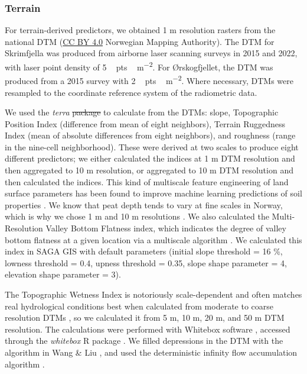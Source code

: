 \documentclass[soil, manuscript]{copernicus}
\providecommand{\DIFadd}[1]{{\protect\color{blue}\uwave{#1}}} %
\providecommand{\DIFdel}[1]{{\protect\color{red}\sout{#1}}}                      %
\providecommand{\DIFaddbegin}{} %
\providecommand{\DIFaddend}{} %
\providecommand{\DIFdelbegin}{} %
\providecommand{\DIFdelend}{} %
\begin{document}
\DIFaddend \subsubsection{Terrain}

For terrain-derived predictors, we obtained 1 m resolution rasters from the national DTM (\href{https://creativecommons.org/licenses/by/4.0/}{CC BY 4.0} Norwegian Mapping Authority).
The DTM for Skrimfjella was produced from airborne laser scanning surveys in 2015 and 2022, with laser point density of \unit{5\,pts\,m^{-2}}.
For Ørskogfjellet, the DTM was produced from a 2015 survey with \unit{2\,pts\,m^{-2}}.
Where necessary, DTMs were resampled to the coordinate reference system of the radiometric data.

We used the \emph{terra} \DIFdelbegin \DIFdel{package }\DIFdelend \DIFaddbegin \DIFadd{R package (v1.8) }\DIFaddend to calculate from the DTMs: slope, Topographic Position Index (difference from mean of eight neighbors), Terrain Ruggedness Index (mean of absolute differences from eight neighbors), and roughness (range in the nine-cell neighborhood).
These were derived at two scales to produce eight different predictors; we either calculated the indices at 1 m DTM resolution and then aggregated to 10 m resolution, or aggregated to 10 m DTM resolution and then calculated the indices.
This kind of multiscale feature engineering of land surface parameters has been found to improve machine learning predictions of soil properties \citep{millerImpactMultiscalePredictor2015, dornikOptimalScalingPredictors2022, newmanAssessingSpatiallyHeterogeneous2023}.
We know that peat depth tends to vary at fine scales in Norway, which is why we chose 1 m and 10 m resolutions \citep{maxwellLandsurfaceParametersSpatial2022}.
We also calculated the Multi-Resolution Valley Bottom Flatness index, which indicates the degree of valley bottom flatness at a given location via a multiscale algorithm \citep{gallantMultiresolutionIndexValley2003}.
We calculated this index in SAGA GIS \citep[v.9.3.2, Morphometry library,][]{conradSystemAutomatedGeoscientific2015} with default parameters (initial slope threshold = 16 \%, lowness threshold = 0.4, upness threshold = 0.35, slope shape parameter = 4, elevation shape parameter = 3).

The Topographic Wetness Index \citep{quinnPredictionHillslopeFlow1991} is notoriously scale-dependent and often matches real hydrological conditions best when calculated from moderate to coarse resolution DTMs \citep{agrenEvaluatingDigitalTerrain2014, riihimakiTopographicWetnessIndex2021}, so we calculated it from 5 m, 10 m, 20 m, and 50 m DTM resolution.
The calculations were performed with Whitebox software \citep{lindsayWhiteboxGATCase2016}, accessed through the \emph{whitebox} R package \citep[v2.4,][]{wuWhiteboxWhiteboxToolsFrontend2022}.
We filled depressions in the DTM with the algorithm in Wang \& Liu \citeyearpar{wangEfficientMethodIdentifying2006}, and used the deterministic infinity flow accumulation algorithm \citep{tarbotonNewMethodDetermination1997}.
\end{document}
